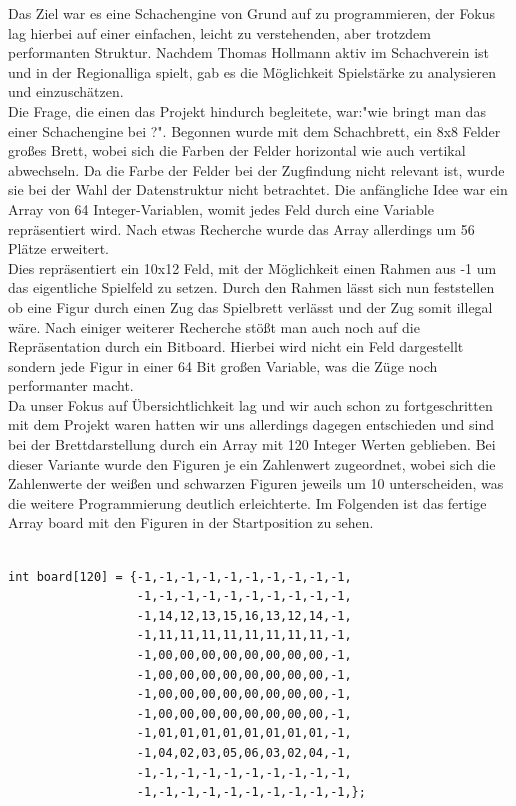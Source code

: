 \documentclass[a4paper, 12pt]{article}
\begin{document}
Das Ziel war es eine Schachengine von Grund auf zu programmieren, der Fokus lag hierbei auf einer einfachen, leicht zu verstehenden, aber trotzdem performanten Struktur.
Nachdem Thomas Hollmann aktiv im Schachverein ist und in der Regionalliga spielt, gab es die Möglichkeit Spielstärke zu analysieren und einzuschätzen. \\
Die Frage, die einen das Projekt hindurch begleitete, war:"wie bringt man das einer Schachengine bei ?".
Begonnen wurde mit dem Schachbrett, ein 8x8 Felder großes Brett, wobei sich die Farben der Felder horizontal wie auch vertikal abwechseln.
Da die Farbe der Felder bei der Zugfindung nicht relevant ist, wurde sie bei der Wahl der Datenstruktur nicht betrachtet.
Die anfängliche Idee war ein Array von 64 Integer-Variablen, womit jedes Feld durch eine Variable repräsentiert wird.
Nach etwas Recherche wurde das Array allerdings um 56 Plätze erweitert.\cite{10x12}\\
Dies repräsentiert ein 10x12 Feld, mit der Möglichkeit einen Rahmen aus \glqq{}-1\grqq{} um das eigentliche Spielfeld zu setzen.
Durch den Rahmen lässt sich  nun feststellen ob eine Figur durch einen Zug das Spielbrett verlässt und der Zug somit illegal wäre.
Nach einiger weiterer Recherche stößt man auch noch auf die Repräsentation durch ein Bitboard.
Hierbei wird nicht ein Feld dargestellt sondern jede Figur in einer 64 Bit großen Variable, was die Züge noch performanter macht.\cite{bitboard}\\
Da unser Fokus auf Übersichtlichkeit lag und wir auch schon zu fortgeschritten mit dem Projekt waren hatten wir uns allerdings dagegen entschieden und sind bei der Brettdarstellung durch ein Array mit 120 Integer Werten geblieben.
Bei dieser Variante wurde den Figuren je ein Zahlenwert zugeordnet, wobei sich die Zahlenwerte der weißen und schwarzen Figuren jeweils um 10 unterscheiden, was die weitere Programmierung deutlich erleichterte. Im Folgenden ist das fertige Array \glqq{}board\grqq{} mit den Figuren in der Startposition zu sehen.\\

\pagebreak

\begin{lstlisting}

int board[120] = {-1,-1,-1,-1,-1,-1,-1,-1,-1,-1,
                  -1,-1,-1,-1,-1,-1,-1,-1,-1,-1,
                  -1,14,12,13,15,16,13,12,14,-1,
                  -1,11,11,11,11,11,11,11,11,-1,
                  -1,00,00,00,00,00,00,00,00,-1,
                  -1,00,00,00,00,00,00,00,00,-1,
                  -1,00,00,00,00,00,00,00,00,-1,
                  -1,00,00,00,00,00,00,00,00,-1,
                  -1,01,01,01,01,01,01,01,01,-1,
                  -1,04,02,03,05,06,03,02,04,-1,
                  -1,-1,-1,-1,-1,-1,-1,-1,-1,-1,
                  -1,-1,-1,-1,-1,-1,-1,-1,-1,-1,};
\end{lstlisting}
\end{document}

